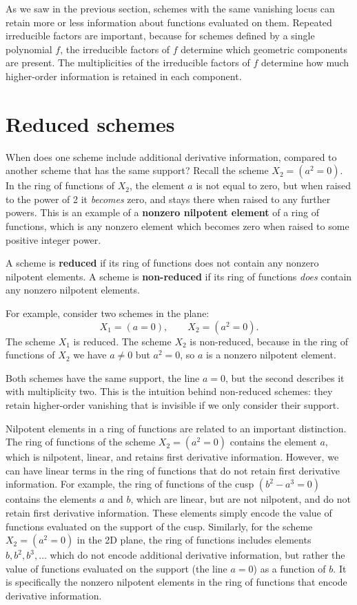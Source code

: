 \documentclass[12pt]{article}
\begin{document}
As we saw in the previous section, schemes with the same vanishing locus can retain more or less information about functions evaluated on them. Repeated irreducible factors are important, because for schemes defined by a single polynomial $f$, the irreducible factors of $f$ determine which geometric
components are present. The multiplicities of the irreducible factors of $f$ determine how much higher-order information is retained in each component.

\newpage
\section{Reduced schemes}\label{reduced-and-non-reduced}

When does one scheme include additional derivative information, compared to another scheme that has the same support? Recall the scheme $X_2=(a^2 = 0)$. In the ring of functions of $X_2$, the element $a$ is not equal to zero, but when raised to the power of 2 it \emph{becomes} zero, and stays there when raised to any further powers. This is an example of a \textbf{nonzero nilpotent element} of a ring of functions, which is any nonzero element which becomes zero when raised to some positive integer power.

A scheme is \textbf{reduced} if its ring of functions
does not contain any nonzero nilpotent elements.
A scheme is \textbf{non-reduced} if its ring of functions
\emph{does} contain any nonzero nilpotent elements.

For example, consider two schemes in the plane:
\[
X_1=(a=0), \qquad X_2=(a^2=0).
\]
The scheme $X_1$ is reduced. The scheme $X_2$ is non-reduced, because in the ring of functions of $X_2$ we have $a\neq 0$
but $a^2=0$, so $a$ is a nonzero nilpotent element.

Both schemes have the same support, the line $a=0$,
but the second describes it with multiplicity two.
This is the intuition behind non-reduced schemes:
they retain higher-order vanishing that is invisible
if we only consider their support.

Nilpotent elements in a ring of functions are related to an important distinction. The ring of functions of the scheme $X_2=(a^2 = 0)$ contains the element $a$, which is nilpotent, linear, and retains first derivative information. However, we can have linear terms in the ring of functions that do not retain first derivative information. For example, the ring of functions of the cusp $(b^2-a^3=0)$ contains the elements $a$ and $b$, which are linear, but are not nilpotent, and do not retain first derivative information. These elements simply encode the value of functions evaluated on the support of the cusp. Similarly, for the scheme $X_2=(a^2 = 0)$ in the 2D plane, the ring of functions includes elements $b, b^2, b^3, \dots$ which do not encode additional derivative information, but rather the value of functions evaluated on the support (the line $a=0$) as a function of $b$. It is specifically the nonzero nilpotent elements in the ring of functions that encode derivative information.
\end{document}
